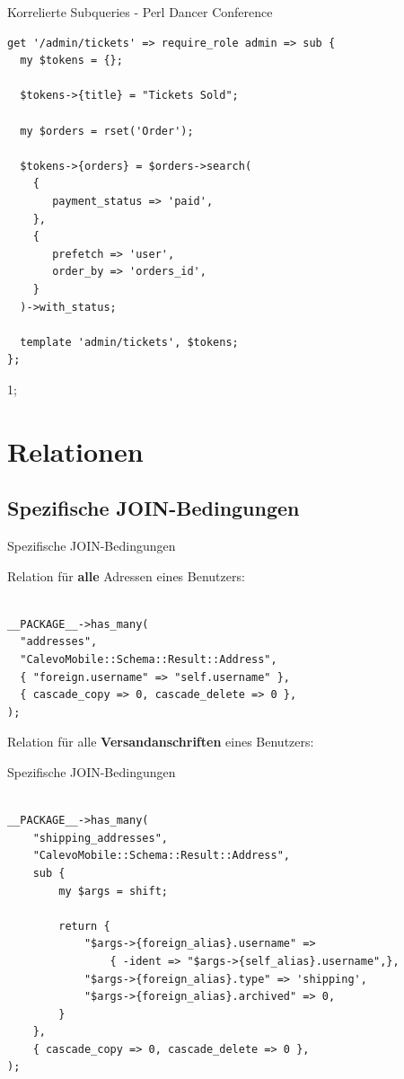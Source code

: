 \begin{frame}[fragile]{Korrelierte Subqueries - Perl Dancer Conference}
  \begin{lstlisting}
get '/admin/tickets' => require_role admin => sub {
  my $tokens = {};

  $tokens->{title} = "Tickets Sold";

  my $orders = rset('Order');

  $tokens->{orders} = $orders->search(
    {
       payment_status => 'paid',
    },
    {
       prefetch => 'user',
       order_by => 'orders_id',
    }
  )->with_status;

  template 'admin/tickets', $tokens;
};
\end{lstlisting}
\end{frame}

1;

\section{Relationen}

\subsection{Spezifische JOIN-Bedingungen}

\begin{frame}[fragile]{Spezifische JOIN-Bedingungen}

Relation für \textbf{alle} Adressen eines Benutzers:

\begin{lstlisting}

__PACKAGE__->has_many(
  "addresses",
  "CalevoMobile::Schema::Result::Address",
  { "foreign.username" => "self.username" },
  { cascade_copy => 0, cascade_delete => 0 },
);

\end{lstlisting}
\end{frame}

Relation für alle \textbf{Versandanschriften} eines Benutzers:

\begin{frame}[fragile]{Spezifische JOIN-Bedingungen}
\begin{lstlisting}

__PACKAGE__->has_many(
    "shipping_addresses",
    "CalevoMobile::Schema::Result::Address",
    sub {
        my $args = shift;

        return {
            "$args->{foreign_alias}.username" =>
                { -ident => "$args->{self_alias}.username",},
            "$args->{foreign_alias}.type" => 'shipping',
            "$args->{foreign_alias}.archived" => 0,
        }
    },
    { cascade_copy => 0, cascade_delete => 0 },
);
\end{lstlisting}
\end{frame}

